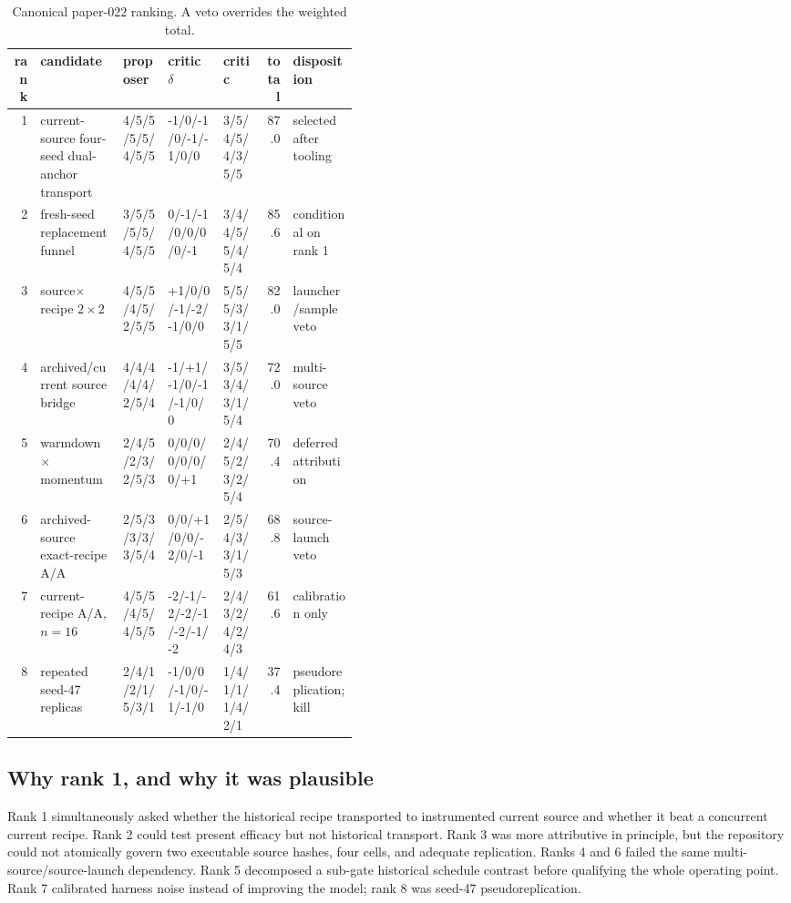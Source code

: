 \documentclass{article}
\begin{document}
\begin{table}[t]
\caption{Canonical paper-022 ranking.  A veto overrides the weighted total.}
\label{tab:p022}
\centering\tiny
\setlength{\tabcolsep}{2.5pt}
\begin{tabular}{r p{0.245\linewidth} l l l r p{0.19\linewidth}}
\toprule
rank & candidate & proposer & critic $\delta$ & critic & total & disposition\\
\midrule
1 & current-source four-seed dual-anchor transport &
4/5/5/5/5/4/5/5 & -1/0/-1/0/-1/-1/0/0 &
3/5/4/5/4/3/5/5 & 87.0 & selected after tooling\\
2 & fresh-seed replacement funnel &
3/5/5/5/5/4/5/5 & 0/-1/-1/0/0/0/0/-1 &
3/4/4/5/5/4/5/4 & 85.6 & conditional on rank 1\\
3 & source$\times$recipe $2\times2$ &
4/5/5/4/5/2/5/5 & +1/0/0/-1/-2/-1/0/0 &
5/5/5/3/3/1/5/5 & 82.0 & launcher/sample veto\\
4 & archived/current source bridge &
4/4/4/4/4/2/5/4 & -1/+1/-1/0/-1/-1/0/0 &
3/5/3/4/3/1/5/4 & 72.0 & multi-source veto\\
5 & warmdown$\times$momentum &
2/4/5/2/3/2/5/3 & 0/0/0/0/0/0/0/+1 &
2/4/5/2/3/2/5/4 & 70.4 & deferred attribution\\
6 & archived-source exact-recipe A/A &
2/5/3/3/3/3/5/4 & 0/0/+1/0/0/-2/0/-1 &
2/5/4/3/3/1/5/3 & 68.8 & source-launch veto\\
7 & current-recipe A/A, $n=16$ &
4/5/5/4/5/4/5/5 & -2/-1/-2/-2/-1/-2/-1/-2 &
2/4/3/2/4/2/4/3 & 61.6 & calibration only\\
8 & repeated seed-47 replicas &
2/4/1/2/1/5/3/1 & -1/0/0/-1/0/-1/-1/0 &
1/4/1/1/1/4/2/1 & 37.4 & pseudoreplication; kill\\
\bottomrule
\end{tabular}
\end{table}

\subsection{Why rank 1, and why it was plausible}

Rank 1 simultaneously asked whether the historical recipe transported to
instrumented current source and whether it beat a concurrent current recipe.
Rank 2 could test present efficacy but not historical transport.  Rank 3 was
more attributive in principle, but the repository could not atomically govern
two executable source hashes, four cells, and adequate replication.  Ranks 4
and 6 failed the same multi-source/source-launch dependency.  Rank 5
decomposed a sub-gate historical schedule contrast before qualifying the
whole operating point.  Rank 7 calibrated harness noise instead of improving
the model; rank 8 was seed-47 pseudoreplication.
\end{document}
